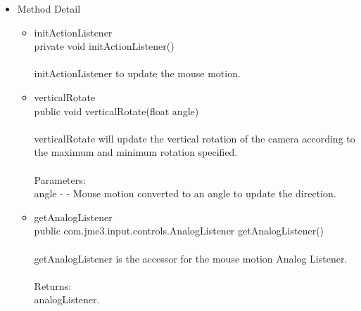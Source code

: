 \documentclass[letterpaper]{article}
\begin{document}
\begin{itemize}
										\item	Method Detail
												\begin{itemize}
													\item	initActionListener \\
															private void initActionListener() \\ \\
															initActionListener to update the mouse motion.
													\item	verticalRotate \\
															public void verticalRotate(float angle) \\ \\
															verticalRotate will update the vertical rotation of the camera according to the maximum and minimum rotation specified. \\ \\
															Parameters: \\
															angle - - Mouse motion converted to an angle to update the direction.
													\item	getAnalogListener \\
															public com.jme3.input.controls.AnalogListener getAnalogListener() \\ \\
															getAnalogListener is the accessor for the mouse motion Analog Listener. \\ \\
															Returns: \\
															analogListener.
												\end{itemize}
									\end{itemize}
								
								\vspace{0.2in}
\end{document}
